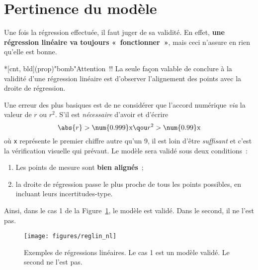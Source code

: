 \documentclass[a4paper, 12pt, garamond]{book}
\begin{document}
\section{Pertinence du modèle}
Une fois la régression effectuée, il faut juger de sa validité. En effet,
\textbf{une régression linéaire va toujours «~fonctionner~»}, mais ceci n'assure
en rien qu'elle est bonne.

\begin{tcb}*[cnt, bld](prop)"bomb"{Attention~!!}
	La seule façon valable de conclure à la validité d'une régression linéaire est
	d'observer l'alignement des points avec la droite de régression.
\end{tcb}

Une erreur des plus basiques est de ne considérer que l'accord numérique
\textit{via} la valeur de $r$ ou $r^{2}$. S'il est \textit{nécessaire} d'avoir
et d'écrire
\[
	\abs{r} > \num{0.999}\mathrm{x}
	\qou
	r^{2} > \num{0.99}\mathrm{x}
\]
où \texttt{x} représente le premier chiffre autre qu'un 9, il est loin d'être
\textit{suffisant} et c'est la vérification visuelle qui prévaut. Le modèle sera
validé sous deux conditions~:
\begin{enumerate}
	\item Les points de mesure sont \textbf{bien alignés}~;
	\item la droite de régression passe le plus proche de tous les points
	      possibles, en incluant leurs incertitudes-type.
\end{enumerate}

Ainsi, dans le cas 1 de la Figure~\ref{fig:reglin_nl}, le modèle est validé.
Dans le second, il ne l'est pas.
\begin{figure}[htbp]
	\centering
	\texttt{[image: figures/reglin\_nl]}
	\caption{Exemples de régressions linéaires. Le cas 1 est un modèle validé. Le
		second ne l'est pas.}
	\label{fig:reglin_nl}
\end{figure}
\end{document}
